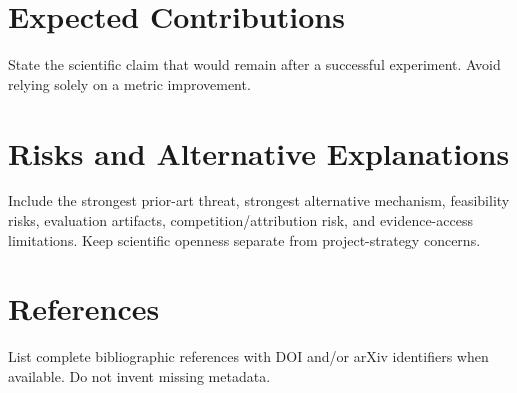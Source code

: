 \documentclass[11pt]{article}
\begin{document}
\section{Expected Contributions}
State the scientific claim that would remain after a successful experiment. Avoid relying solely on a metric improvement.

\section{Risks and Alternative Explanations}
Include the strongest prior-art threat, strongest alternative mechanism, feasibility risks, evaluation artifacts, competition/attribution risk, and evidence-access limitations. Keep scientific openness separate from project-strategy concerns.

\section{References}
List complete bibliographic references with DOI and/or arXiv identifiers when available. Do not invent missing metadata.
\end{document}
